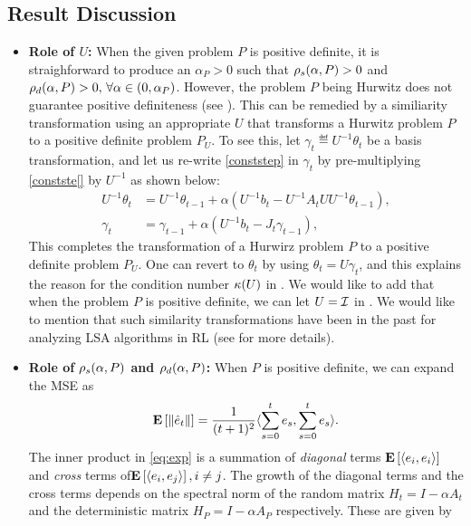 \subsection{Result Discussion}
\begin{itemize}[leftmargin=*, before = \leavevmode\vspace{-\baselineskip}]
\item \textbf{Role of $U$:} When the given problem $P$ is positive definite, it is straighforward to produce an $\alpha_P>0$ such that $\rho_s(\alpha,P)>0$ and $\rho_d(\alpha,P)>0,\,\forall \alpha\in(0,\alpha_P)$. However, the problem $P$ being Hurwitz does not guarantee positive definiteness (see ). This can be remedied by a similiarity transformation using an appropriate $U$ that transforms a Hurwitz problem $P$ to a positive definite problem $P_U$. To see this, let $\gamma_t\eqdef U^{-1 }\theta_t$ be a basis transformation, and let us re-write \eqref{conststep} in $\gamma_t$ by pre-multiplying \eqref{constste[} by $U^{-1}$ as shown below:
\begin{align*}
U^{-1}\theta_t&=U^{-1}\theta_{t-1}+\alpha(U^{-1} b_t- U^{-1}A_t U U^{-1}\theta_{t-1}),\\
\gamma_t&=\gamma_{t-1}+\alpha(U^{-1} b_t- J_t\gamma_{t-1}),
\end{align*}
This completes the transformation of a Hurwirz problem $P$ to a positive definite problem $P_U$. One can revert to $\theta_t$ by using $\theta_t=U\gamma_t$, and this explains the reason for the condition number $\kappa(U)$ in . We would like to add that when the problem $P$ is positive definite, we can let $U=\mathcal{I}$ in . We would like to mention that such similarity transformations have been in the past for analyzing LSA algorithms in RL \cite{lihong} (see  for more details).
\item \textbf{Role of $\rho_s(\alpha,P)$ and $\rho_d(\alpha,P)$:} When $P$ is positive definite, we can expand the MSE as \begin{align}\label{eq:exp}\mathbf{E}\left[\left\| \hat{e}_t\right\|\right]=\frac{1}{(t+1)^2}\langle\sum_{s=0}^t e_s,\sum_{s=0}^t e_s\rangle.\end{align} The inner product in \eqref{eq:exp} is a summation of \emph{diagonal} terms $\mathbf{E}\left[\langle e_i,e_i\rangle\right]$ and \emph{cross} terms of$\mathbf{E}\left[\langle e_i,e_j\rangle\right],i\neq j$. The growth of the diagonal terms and the cross terms depends on the spectral norm of the random matrix $H_t=I-\alpha A_t$ and the deterministic matrix $H_P=I-\alpha A_P$ respectively. These are given by
\begin{comment}

\end{comment}
\end{itemize}
